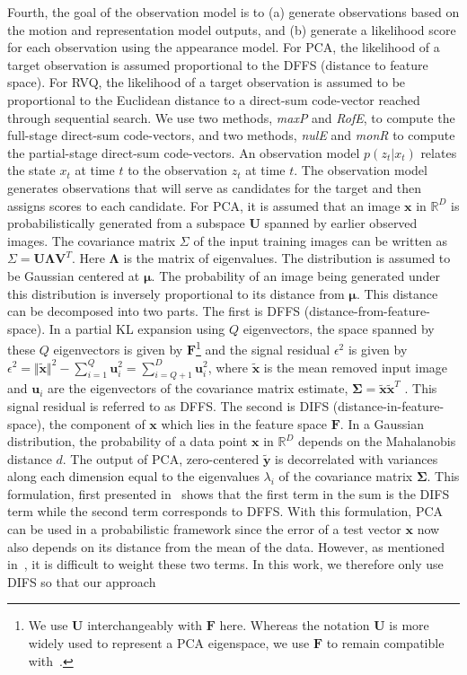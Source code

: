 \documentclass{article}
\begin{document}
Fourth, the goal of the observation model is to (a) generate observations based on the motion and representation model outputs, and (b) generate a likelihood score for each observation using the appearance model.  For PCA, the likelihood of a target observation is assumed proportional to the DFFS (distance to feature space).  For RVQ, the likelihood of a target observation is assumed to be proportional to the Euclidean distance to a direct-sum code-vector reached through sequential search.  We use two methods, \emph{maxP} and \emph{RofE}, to compute the full-stage direct-sum code-vectors, and two methods, \emph{nulE} and \emph{monR} to compute the partial-stage direct-sum code-vectors. An observation model $p(z_t|x_t)$ relates the state $x_t$ at time $t$ to the observation $z_t$ at time $t$.  The observation model generates observations that will serve as candidates for the target and then assigns scores to each candidate.  For PCA, it is assumed that an image $\mathbf{x}$ in $\mathbb{R}^D$ is probabilistically generated from a subspace $\mathbf{U}$ spanned by earlier observed images.  The covariance matrix $\Sigma$ of the input training images can be written as $\Sigma = \mathbf{U}\mathbf{\Lambda} \mathbf{V}^T$.  Here $\mathbf{\Lambda}$ is the matrix of eigenvalues.  The distribution is assumed to be Gaussian centered at $\boldsymbol{\mu}$.  The probability of an image being generated under this distribution is inversely proportional to its distance from $\boldsymbol{\mu}$.  This distance can be decomposed into two parts.  The first is DFFS (distance-from-feature-space).  In a partial KL expansion using $Q$ eigenvectors, the space spanned by these $Q$ eigenvectors is given by $\mathbf{F}$\footnote{We use $\mathbf{U}$ interchangeably with $\mathbf{F}$ here.  Whereas the notation $\mathbf{U}$ is more widely used to represent a PCA eigenspace, we use $\mathbf{F}$ to remain compatible with~\cite{1997_JNL_EigenTRK_Moghaddam}.} and the signal residual $\epsilon^2$ is given by $\epsilon^2 = \Vert \tilde{\mathbf{x}} \Vert^2 - \sum\limits_{i=1}^Q \mathbf{u}_i^2 = \sum\limits_{i=Q+1}^D \mathbf{u}_i^2$, where $\tilde{\mathbf{x}}$ is the mean removed input image and $\mathbf{u}_i$ are the eigenvectors of the covariance matrix estimate, $\boldsymbol\Sigma=\tilde{\mathbf{x}}\tilde{\mathbf{x}}^T$  .  This signal residual is referred to as DFFS.  The second is DIFS (distance-in-feature-space), the component of $\mathbf{x}$ which lies in the feature space $\mathbf{F}$.  In a Gaussian distribution, the probability of a data point $\mathbf{x}$ in $\mathbb{R}^D$ depends on the Mahalanobis distance $d$.  The output of PCA, zero-centered $\mathbf{\tilde{y}}$ is decorrelated with variances along each dimension equal to the eigenvalues $\lambda_i$ of the covariance matrix $\boldsymbol\Sigma$.  This formulation, first presented in~\cite{1997_JNL_EigenTRK_Moghaddam} shows that the first term in the sum is the DIFS term while the second term corresponds to DFFS.  With this formulation, PCA can be used in a probabilistic framework since the error of a test vector $\mathbf{x}$ now also depends on its distance from the mean of the data.  However, as mentioned in~\cite{2008_JNL_subspaceTRK_Ross}, it is difficult to weight these two terms.  In this work, we therefore only use DIFS so that our approach 
\end{document}
